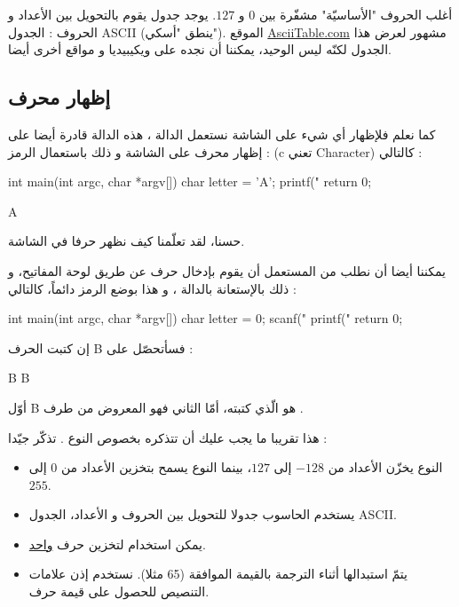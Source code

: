 أغلب الحروف "الأساسيّة" مشفّرة بين $0$ و $127$. يوجد جدول يقوم بالتحويل بين الأعداد و الحروف : الجدول
\textenglish{ASCII}
(ينطق "أسكي"). الموقع
\href{http://www.asciitable.com/}{\textenglish{AsciiTable.com}}
مشهور لعرض هذا الجدول لكنّه ليس الوحيد، يمكننا أن نجده على ويكيبيديا و مواقع أخرى أيضا.

\subsection{إظهار محرف}

كما نعلم فلإظهار أي شيء على الشاشة نستعمل الدالة
،
هذه الدالة قادرة أيضا على إظهار محرف على الشاشة و ذلك باستعمال الرمز :
(\textenglish{c} تعني \textenglish{Character})
كالتالي :

\begin{Csource}
int main(int argc, char *argv[])
{
	char letter = 'A';
	printf("%
	return 0;
}
\end{Csource}

\begin{Console}
A
\end{Console}

حسنا، لقد تعلّمنا كيف نظهر حرفا في الشاشة.

يمكننا أيضا أن نطلب من المستعمل أن يقوم بإدخال حرف عن طريق لوحة المفاتيح، و ذلك بالإستعانة بالدالة
،
و هذا بوضع الرمز
دائماً، كالتالي :

\begin{Csource}
int main(int argc, char *argv[])
{
	char letter = 0;
	scanf("%
	printf("%
	return 0;
}
\end{Csource}

إن كتبت الحرف
\textenglish{B}
فسأتحصّل على :

\begin{Console}
B
B
\end{Console}
أوّل
\textenglish{B}
هو الّذي كتبته، أمّا الثاني فهو المعروض من طرف
.

هذا تقريبا ما يجب عليك أن تتذكره بخصوص النوع .
تذكّر جيّدا :

\begin{itemize}
  \item  النوع
يخزّن الأعداد من
$-128$
إلى
$127$،
بينما النوع
يسمح بتخزين الأعداد من
$0$
إلى
$255$.
  \item يستخدم الحاسوب جدولا للتحويل بين الحروف و الأعداد، الجدول
\textenglish{ASCII}.
  \item يمكن استخدام
لتخزين حرف
\underline{واحد}.
  \item {}
يتمّ استبدالها أثناء الترجمة بالقيمة الموافقة (65 مثلا). نستخدم إذن علامات التنصيص للحصول على قيمة حرف.
\end{itemize}

